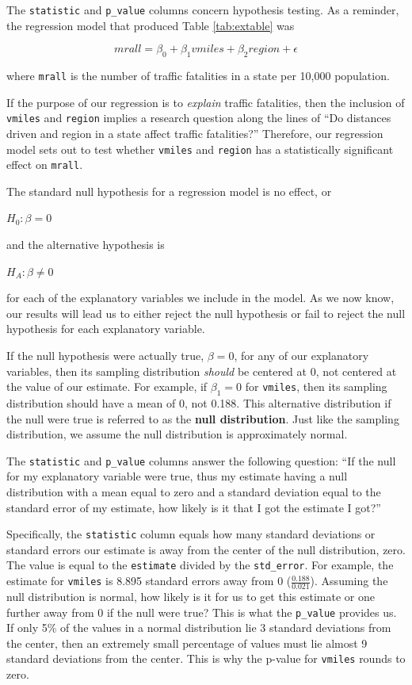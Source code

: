 \documentclass[
]{book}
\begin{document}
The \texttt{statistic} and \texttt{p\_value} columns concern hypothesis testing. As a reminder, the regression model that produced Table \ref{tab:extable} was

\begin{equation}
mrall = \beta_0 + \beta_1vmiles + \beta_2region + \epsilon
\label{eq:exmodel}
\end{equation}

where \texttt{mrall} is the number of traffic fatalities in a state per 10,000 population.

If the purpose of our regression is to \emph{explain} traffic fatalities, then the inclusion of \texttt{vmiles} and \texttt{region} implies a research question along the lines of ``Do distances driven and region in a state affect traffic fatalities?'' Therefore, our regression model sets out to test whether \texttt{vmiles} and \texttt{region} has a statistically significant effect on \texttt{mrall}.

The standard null hypothesis for a regression model is no effect, or

\(H_0: \beta=0\)

and the alternative hypothesis is

\(H_A: \beta \neq 0\)

for each of the explanatory variables we include in the model. As we now know, our results will lead us to either reject the null hypothesis or fail to reject the null hypothesis for each explanatory variable.

If the null hypothesis were actually true, \(\beta=0\), for any of our explanatory variables, then its sampling distribution \emph{should} be centered at 0, not centered at the value of our estimate. For example, if \(\beta_1=0\) for \texttt{vmiles}, then its sampling distribution should have a mean of 0, not 0.188. This alternative distribution if the null were true is referred to as the \textbf{null distribution}. Just like the sampling distribution, we assume the null distribution is approximately normal.

The \texttt{statistic} and \texttt{p\_value} columns answer the following question: ``If the null for my explanatory variable were true, thus my estimate having a null distribution with a mean equal to zero and a standard deviation equal to the standard error of my estimate, how likely is it that I got the estimate I got?''

Specifically, the \texttt{statistic} column equals how many standard deviations or standard errors our estimate is away from the center of the null distribution, zero. The value is equal to the \texttt{estimate} divided by the \texttt{std\_error}. For example, the estimate for \texttt{vmiles} is 8.895 standard errors away from 0 (\(\frac {0.188}{0.021}\)). Assuming the null distribution is normal, how likely is it for us to get this estimate or one further away from 0 if the null were true? This is what the \texttt{p\_value} provides us. If only 5\% of the values in a normal distribution lie 3 standard deviations from the center, then an extremely small percentage of values must lie almost 9 standard deviations from the center. This is why the p-value for \texttt{vmiles} rounds to zero.
\end{document}
